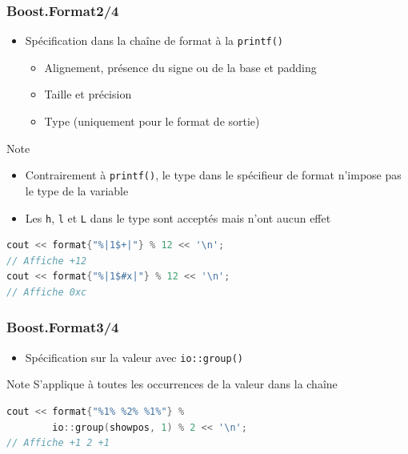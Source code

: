 \documentclass[C++.tex]{subfiles}
\begin{document}
\begin{frame}[fragile]
	\frametitle{Boost.Format\titlehfill{}2/4}
	\begin{itemize}
		\item Spécification dans la chaîne de format à la \lstinline|printf()|
		\begin{itemize}
			\item Alignement, présence du signe ou de la base et padding
			\item Taille et précision
			\item Type (uniquement pour le format de sortie)
		\end{itemize}
	\end{itemize}

	\begin{block}{Note}
		\begin{itemize}
			\item Contrairement à \lstinline|printf()|, le type dans le spécifieur de format n'impose pas le type de la variable
			\item Les \lstinline|h|, \lstinline|l| et \lstinline|L| dans le type sont acceptés mais n'ont aucun effet
		\end{itemize}
	\end{block}

	\begin{lstlisting}[language=C++]
cout << format{"%|1$+|"} % 12 << '\n';
// Affiche +12
cout << format{"%|1$#x|"} % 12 << '\n';
// Affiche 0xc\end{lstlisting}
\end{frame}

\begin{frame}[fragile]
	\frametitle{Boost.Format\titlehfill{}3/4}
	\begin{itemize}
		\item Spécification sur la valeur avec \lstinline|io::group()|
	\end{itemize}

	\begin{block}{Note}
		S'applique à toutes les occurrences de la valeur dans la chaîne
	\end{block}

	\begin{lstlisting}[language=C++]
cout << format{"%1% %2% %1%"} %
        io::group(showpos, 1) % 2 << '\n';
// Affiche +1 2 +1\end{lstlisting}
\end{frame}
\end{document}
